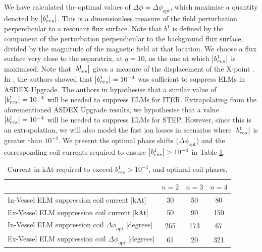 \documentclass[10pt, a4paper, twoside]{article}
\begin{document}
We have calculated the optimal values of $\Delta \phi = \Delta\phi_\text{opt}$, which maximise a quantity denoted by $\abs{b^1_{res}}$. This is a dimensionless measure of the field perturbation perpendicular to a resonant flux surface. 
Note that $b^1$ is defined by the component of the perturbation perpendicular to the background flux surface, divided by the magnitude of the magnetic field at that location.
We choose a flux surface very close to the separatrix, at $q=10$, as the one at which $\abs{b^1_{res}}$ is maximised. 
Note that $\abs{b^1_{res}}$ gives a measure of the displacement of the X-point \cite{ryan2017}. In \cite{suttrop2018}, the authors showed that $\abs{b^1_{res}}=10^{-4}$ was sufficient to suppress ELMs in ASDEX Upgrade. The authors in \cite{liu2015} hypothesise that a similar value of $\abs{b^1_{res}}=10^{-4}$ will be needed to suppress ELMs for ITER. Extrapolating from the aforementioned ASDEX Upgrade results, we hypothesise that a value $\abs{b^1_{res}}=10^{-4}$ will be needed to suppress ELMs for STEP. However, since this is an extrapolation, we will also model the fast ion losses in scenarios where $\abs{b^1_{res}}$ is greater than $10^{-4}$. We present the optimal phase shifts ($\Delta\phi_\text{opt}$) and the corresponding coil currents required to ensure $\abs{b^1_{res}}>10^{-4}$ in Table \ref{table:optimum_currents_and_phases}. 
\begin{table}[htbp]
\centering
\begin{tabular}{lccc}
\hline
 & \( n=2 \) & \( n=3 \) & \( n=4 \) \\
\hline
In-Vessel ELM suppression coil current [kAt] & 30 & 50 & 80 \\
Ex-Vessel ELM suppression coil current [kAt] & 50 & 90 & 150 \\
In-Vessel ELM suppression coil \(\Delta\phi_\text{opt}\) [degrees] & 265 & 173 & 67 \\
Ex-Vessel ELM suppression coil \(\Delta\phi_\text{opt}\) [degrees] & 61 & 20 & 321 \\
\hline
\end{tabular}
\caption{Current in kAt required to exceed \( b^1_{res} > 10^{-4} \), and optimal coil phases.}
\label{table:optimum_currents_and_phases}
\end{table}
\end{document}
